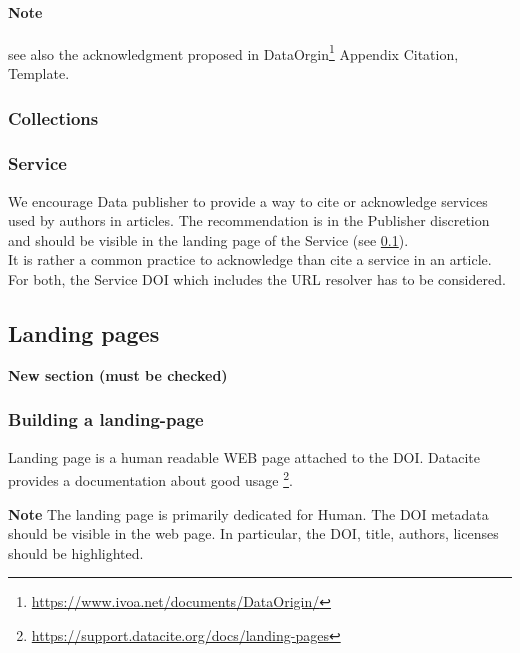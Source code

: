 \documentclass[11pt,a4paper]{ivoa}
\newcommand{\important}[1]{
	\begin{bigdescription}
		\item \color{ivoacolor}\textbf{Note} #1
	\end{bigdescription}
}
\begin{document}
\paragraph{Note} see also the acknowledgment proposed in DataOrgin\footnote{\url{https://www.ivoa.net/documents/DataOrigin/}} Appendix Citation, Template.

\subsubsection{Collections}

\subsubsection{Service}
We encourage Data publisher to provide a way to cite or acknowledge services used by authors in articles. The recommendation is in the Publisher discretion and should be visible in the landing page of the Service (see \ref{sec:landingpage}).\\

It is rather a common practice to acknowledge than cite a service in an article. For both, the Service DOI which includes the URL resolver has to be considered.

\subsection{Landing pages}
\label{sec:landingpage}
\textbf{\color{red}New section (must be checked)}

\subsubsection{Building a landing-page}
Landing page is a human readable WEB page attached to the DOI. Datacite provides a documentation about good usage \footnote{\url{https://support.datacite.org/docs/landing-pages}}.

\important{
	The landing page is primarily dedicated for Human. 
	The DOI metadata should be visible in the web page. In particular, 
	the DOI, title, authors, licenses should be highlighted.
}
\end{document}
